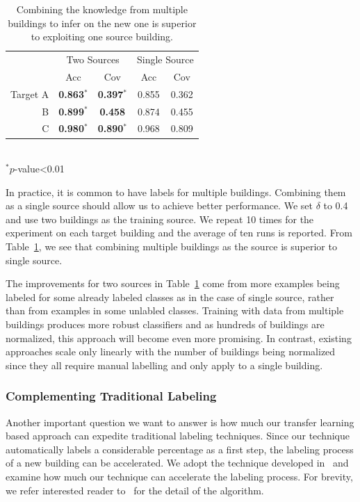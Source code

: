 \begin{table}[h]
\centering
\begin{tabular}{r|cc|cc}
\hline
\multirow{2}{*}{} & \multicolumn{2}{c|}{Two Sources} & \multicolumn{2}{c}{Single Source} \\ \cline{2-5} 
 & Acc & Cov & Acc & Cov \\ \hline\hline
Target A & {\bf 0.863$^\ast$} & {\bf 0.397$^\ast$} & 0.855 & 0.362 \\ \hline
B & {\bf 0.899$^\ast$} & {\bf 0.458} & 0.874 & 0.455 \\ \hline
C & {\bf 0.980$^\ast$} & {\bf 0.890$^\ast$} & 0.968 & 0.809 \\ \hline
\end{tabular}
\\\noindent
$^\ast p$-value<0.01
\caption{Combining the knowledge from multiple buildings to infer on the new one is superior to exploiting one source building.}
\label{2source}
\end{table}

In practice, it is common to have labels for multiple buildings.  
Combining them as a single source should allow us to achieve better performance.
We set $\delta$ to 0.4 and use two buildings as the training source. %
We repeat 10 times for the experiment on each target building and the average of ten runs is reported.
From Table~\ref{2source}, we see that combining multiple buildings as the source is superior to single source.  %

The improvements for two sources in Table~\ref{2source} come from more examples being labeled for some already labeled classes as in the case of single source, rather than from examples in some unlabled classes. 
Training with data from multiple buildings produces more robust classifiers and as hundreds of buildings are normalized, this approach will become even more promising. 
In contrast, existing approaches scale only linearly with the number of buildings being normalized since they all require manual labelling and only apply to a single building.


\subsubsection{Complementing Traditional Labeling}
Another important question we want to answer is how much our transfer learning based approach can expedite traditional labeling techniques. 
Since our technique automatically labels a considerable percentage as a first step, the labeling process of a new building can be accelerated.
We adopt the technique developed in~\cite{cikm} and examine how much our technique can accelerate the labeling process.
For brevity, we refer interested reader to~\cite{cikm} for the detail of the algorithm.

